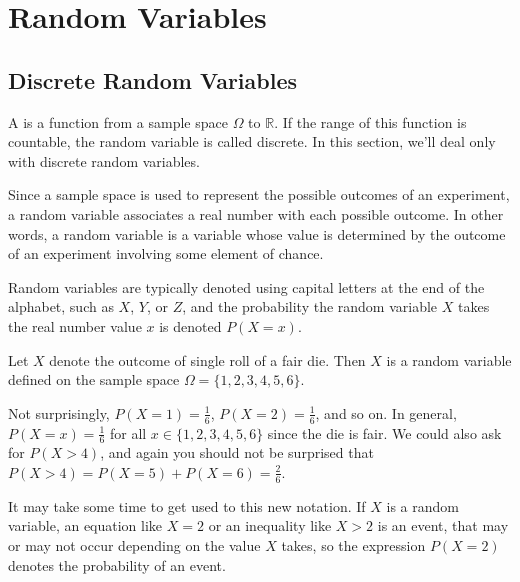 \pagestyle{headings}
\chapter{Random Variables} \label{chp 4}

\section{Discrete Random Variables}\label{RVIntroSec}

\begin{definition}\label{RandomVariableDef} A  is a function from a sample space $\Omega$ to $\mathbb{R}$. If the range of this function is countable, the random variable is called discrete. In this section, we'll deal only with discrete random variables.
\end{definition}

Since a sample space is used to represent the possible outcomes of an experiment, a random variable associates a real number with each possible outcome. In other words, a random variable is a variable whose value is determined by the outcome of an experiment involving some element of chance.

Random variables are typically denoted using capital letters at the end of the alphabet, such as $X$, $Y$, or $Z$, and the probability the random variable $X$ takes the real number value $x$ is denoted $P(X = x)$. 

\begin{example} Let $X$ denote the outcome of single roll of a fair die. Then $X$ is a random variable defined on the sample space $\Omega = \{1,2,3,4,5,6\}$.

Not surprisingly, $P(X = 1) = \frac{1}{6}$, $P(X = 2) = \frac{1}{6}$, and so on. In general, $P(X = x) = \frac{1}{6}$ for all $x \in \{1,2,3,4,5,6\}$ since the die is fair. We could also ask for $P(X > 4)$, and again you should not be surprised that $P(X > 4) = P(X=5) + P(X=6) = \frac{2}{6}$.
\end{example}

\begin{remark} It may take some time to get used to this new notation. If $X$ is a random variable, an equation like $X = 2$ or an inequality like $X > 2$ is an event, that may or may not occur depending on the value $X$ takes, so the expression $P(X = 2)$ denotes the probability of an event. \end{remark}

